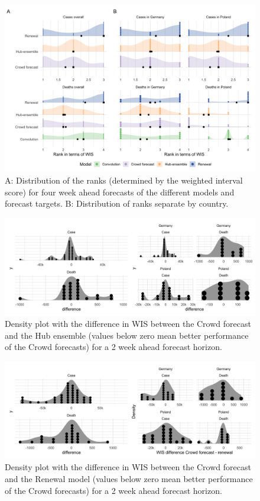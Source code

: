 \documentclass[10pt,letterpaper]{article}
\begin{document}
\begin{figure}[H]
\includegraphics[width=1\linewidth,]{../analysis/plots/distribution_scores_wis-4-ranks} \caption{A: Distribution of the ranks (determined by the weighted interval score) for four week ahead forecasts of the different models and forecast targets. B: Distribution of ranks separate by country.}\label{fig:distribution-scores-ranks-4}
\end{figure}

\begin{figure}[H]
\includegraphics[width=1\linewidth,]{../analysis/plots/difference-wis-crowd-ensemble} \caption{Density plot with the difference in WIS between the Crowd forecast and the Hub ensemble (values below zero mean better performance of the Crowd forecasts) for a 2 week ahead forecast horizon.}\label{fig:distribution-scores-differences}
\end{figure}

\begin{figure}[H]
\includegraphics[width=1\linewidth,]{../analysis/plots/difference-wis-crowd-renewal} \caption{Density plot with the difference in WIS between the Crowd forecast and the Renewal model (values below zero mean better performance of the Crowd forecasts) for a 2 week ahead forecast horizon.}\label{fig:distribution-scores-differences-renewal}
\end{figure}
\end{document}
